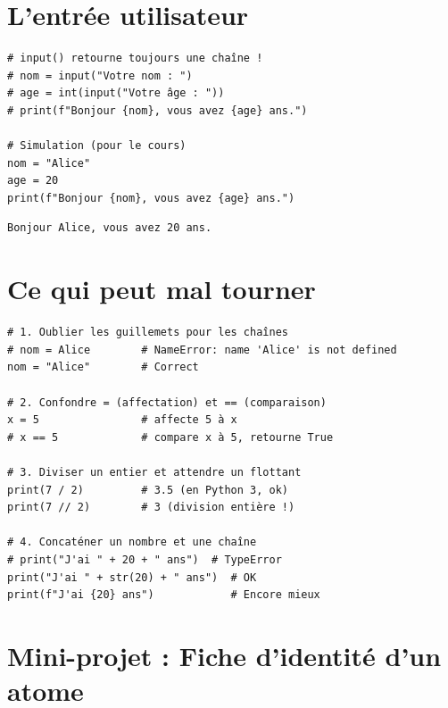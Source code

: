 \section{L'entr\'ee utilisateur}

\begin{codeblock}[title=\textbf{Python --- input}]
\begin{verbatim}
# input() retourne toujours une chaîne !
# nom = input("Votre nom : ")
# age = int(input("Votre âge : "))
# print(f"Bonjour {nom}, vous avez {age} ans.")

# Simulation (pour le cours)
nom = "Alice"
age = 20
print(f"Bonjour {nom}, vous avez {age} ans.")
\end{verbatim}
\end{codeblock}

\begin{codeoutput}
\begin{verbatim}
Bonjour Alice, vous avez 20 ans.
\end{verbatim}
\end{codeoutput}

\section{Ce qui peut mal tourner}

\begin{errmark}
\begin{codeblock}[title=\textbf{Erreurs fr\'equentes}]
\begin{verbatim}
# 1. Oublier les guillemets pour les chaînes
# nom = Alice        # NameError: name 'Alice' is not defined
nom = "Alice"        # Correct

# 2. Confondre = (affectation) et == (comparaison)
x = 5                # affecte 5 à x
# x == 5             # compare x à 5, retourne True

# 3. Diviser un entier et attendre un flottant
print(7 / 2)         # 3.5 (en Python 3, ok)
print(7 // 2)        # 3 (division entière !)

# 4. Concaténer un nombre et une chaîne
# print("J'ai " + 20 + " ans")  # TypeError
print("J'ai " + str(20) + " ans")  # OK
print(f"J'ai {20} ans")            # Encore mieux
\end{verbatim}
\end{codeblock}
\end{errmark}

\section{Mini-projet : Fiche d'identit\'e d'un atome}

